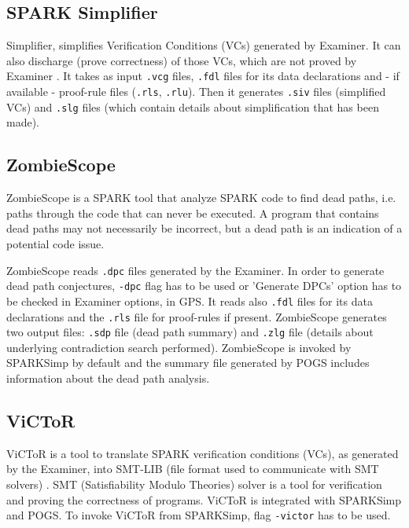 \subsection{SPARK Simplifier}
\label{background:sparkverification:simplifier}

Simplifier, simplifies Verification Conditions (VCs) generated by Examiner. It can also discharge (prove correctness) of those VCs, which are not proved by Examiner \cite{Simplifier:Online}. It takes as input \lstinline{.vcg} files, \lstinline{.fdl} files for its data declarations and - if available - proof-rule files (\lstinline{.rls}, \lstinline{.rlu}). Then it generates \lstinline{.siv} files (simplified VCs) and \lstinline{.slg} files (which contain details about simplification that has been made).



\subsection{ZombieScope}
\label{background:sparkverification:zombiescope}

ZombieScope is a SPARK tool that analyze SPARK code to find dead paths, i.e. paths through the code that can never be executed. A program that contains dead paths may not necessarily be incorrect, but a dead path is an indication of a potential code issue.

ZombieScope reads \lstinline{.dpc} files generated by the Examiner. In order to generate dead path conjectures, \lstinline{-dpc} flag has to be used or 'Generate DPCs' option has to be checked in Examiner options, in GPS. It reads also \lstinline{.fdl} files for its data declarations and the \lstinline{.rls} file for proof-rules if present. ZombieScope generates two output files: \lstinline{.sdp} file (dead path summary) and \lstinline{.zlg} file (details about underlying contradiction search performed). ZombieScope is invoked by SPARKSimp by default and the summary file generated by POGS includes information about the dead path analysis.



\subsection{ViCToR}
\label{background:sparkverification:victor}

ViCToR is a tool to translate SPARK verification conditions (VCs), as generated by the Examiner, into SMT-LIB (file format used to communicate with SMT solvers) \cite{Victor:Online}. SMT (Satisfiability Modulo Theories) solver is a tool for verification and proving the correctness of programs. ViCToR is integrated with SPARKSimp and POGS. To invoke ViCToR from SPARKSimp, flag \lstinline{-victor} has to be used.



